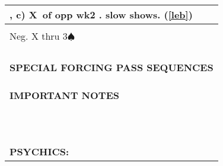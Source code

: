 \documentclass{article}
\renewcommand\S{\ensuremath{\spadesuit}}
\newcommand\X{{\footnotesize X}}
\begin{document}
\begin{minipage}{90mm}
\begin{tabular}{| p{88mm} |}
                \\ \hline, c) \X\ of opp wk2 . slow shows. (\ref{leb})
		\\ \hline
		\\ \hline
                Neg. X thru 3\S\
		\\ \hline
		\\ \hline
		\\ \hline
		\\ \hline
		\\ \hline
		\textbf{SPECIAL FORCING PASS SEQUENCES} \\ \hline
		\\ \hline
		\\ \hline
		\\ \hline
		\textbf{IMPORTANT NOTES} \\ \hline
		\\ \hline
		\\ \hline
		\\ \hline
		\\ \hline
		\\ \hline
		\\ \hline
		\\ \hline
		\\ \hline
		\\ \hline
		\\ \hline
		\\ \hline
		\textbf{PSYCHICS:} \\ \hline
	\end{tabular}
\end{minipage}
\end{document}
